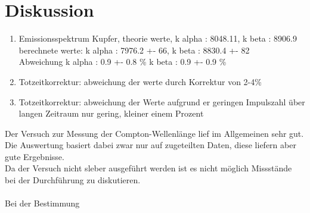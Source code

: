 \section{Diskussion}
    \begin{enumerate}
        \item Emissionsspektrum Kupfer, theorie werte,      k alpha : 8048.11,      k beta : 8906.9\\
                                        berechnete werte:   k alpha : 7976.2 +- 66, k beta : 8830.4 +- 82\\
                                        Abweichung          k alpha : 0.9 +- 0.8 \% k beta : 0.9 +- 0.9 \%
        \item Totzeitkorrektur: abweichung der werte durch Korrektur von 2-4\% 

        \item Totzeitkorrektur: abweichung der Werte aufgrund er geringen Impulszahl über langen Zeitraum nur gering, kleiner einem Prozent


    \end{enumerate}

Der Versuch zur Messung der Compton-Wellenlänge lief im Allgemeinen sehr gut. Die Auswertung basiert dabei zwar nur auf zugeteilten Daten, diese liefern aber gute Ergebnisse.\\
Da der Versuch nicht sleber ausgeführt werden ist es nicht möglich Missstände bei der Durchführung zu diskutieren.\\\\
\noindent
Bei der Bestimmung
